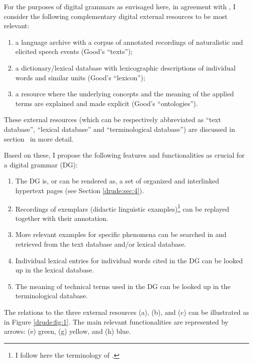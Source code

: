 For the purposes of digital grammars as envisaged here, in agreement with \citet{Good2004}, I consider the following complementary digital external resources to be most relevant:

\begin{enumerate}
\item \label{bkm:Ref296272363} a language archive with a corpus of annotated recordings of naturalistic and elicited speech events (Good's  ``texts'');
\item \label{bkm:Ref296272365} a dictionary/lexical database with lexicographic descriptions of individual words and similar units  (Good's  ``lexicon''); 
\item \label{bkm:Ref296272357} a resource where the underlying concepts and the meaning of the applied terms are explained and made explicit  (Good's  ``ontologies'').
\end{enumerate}

These external resources (which can be respectively abbreviated as ``text database'', ``lexical database'' and ``terminological database'') are discussed in section~ in more detail.

Based on these, I propose the following features and functionalities as crucial for a digital grammar (DG):

\begin{enumerate}
\item The DG is, or can be rendered as, a set of organized and interlinked hypertext pages (see Section \ref{drude:sec:4}).
\item \label{bkm:Ref296267835}Recordings of exemplars  (didactic linguistic examples)\footnote{I 
 follow here the terminology of \citet{Good2004}.
} can be replayed together with their annotation.
\item More relevant examples for specific phenomena can be searched in and retrieved from the text database and/or lexical database.
\item \label{bkm:Ref296267849}Individual lexical entries for individual words cited in the DG can be looked up in the lexical database.
\item \label{bkm:Ref296267853}The meaning of technical terms used in the DG can be looked up in the terminological database.
\end{enumerate}

The relations to the three external resources (a), (b), and (c) can be illustrated as in Figure \ref{drude:fig:1}. The main relevant functionalities are represented by arrows: (e) green, (g) yellow, and (h) blue.


